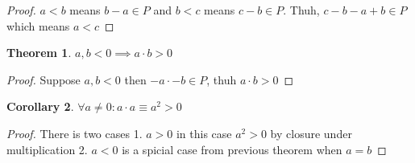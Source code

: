 \documentclass[11pt, a4paper]{article}
\newtheorem{theorem}{Theorem}
\newtheorem{corollary}[theorem]{Corollary}
\begin{document}
\begin{proof}
  $a < b$ means $b - a \in P$ and $b < c$ means $c - b \in P$. Thuh, $c - b - a + b \in P$ which means
$a < c$
\end{proof}

\begin{theorem}
  $a, b < 0 \implies a \cdot b > 0$
\end{theorem}

\begin{proof}
  Suppose $a, b < 0$ then \( -a \cdot -b \in P \), thuh $a \cdot b > 0$
\end{proof}

\begin{corollary}
  $\forall a \neq 0 : a \cdot a \equiv a^{2} > 0$
\end{corollary}

\begin{proof}
  There is two cases
 1. $a > 0$ in this case $a^{2} > 0$ by closure under multiplication
 2. $a < 0$ is a spicial case from previous theorem when $a = b$
\end{proof}
\end{document}
